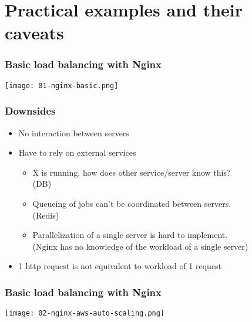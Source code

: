 \section{Practical examples and their caveats}
\frame{\tableofcontents[currentsection]}

\begin{frame}
    \frametitle{Basic load balancing with Nginx}
    \begin{center}
        \texttt{[image: 01-nginx-basic.png]}
    \end{center}

\end{frame}

\begin{frame}
    \frametitle{Downsides}
    \begin{itemize}
        \item No interaction between servers
        \item Have to rely on external services
        \begin{itemize}
            \item X is running, how does other service/server know this? \\ 
            (DB) 
            \item Queueing of jobs can't be coordinated between servers. \\ 
            (Redis)
            \item Parallelization of a single server is hard to implement. \\ 
            (Nginx has no knowledge of the workload of a single server)
        \end{itemize}
    \item 1 http request is not equivalent to workload of 1 request
    \end{itemize}
\end{frame}



\begin{frame}
    \frametitle{Basic load balancing with Nginx}
    \begin{center}
        \texttt{[image: 02-nginx-aws-auto-scaling.png]}
    \end{center}
\end{frame}

